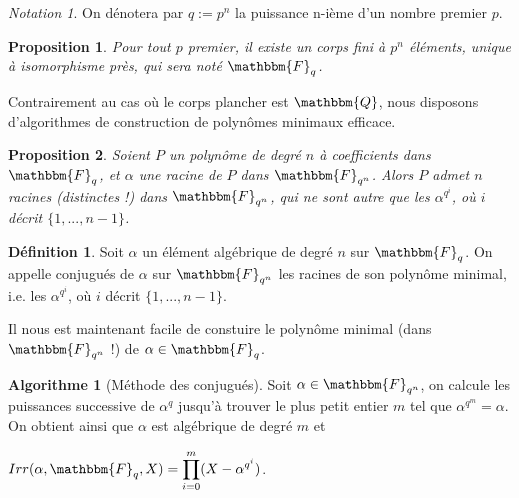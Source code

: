 \documentclass[12pt]{article}
\newcommand{\Q}{\mathbbm{Q}}
\newcommand{\Fq}{\mathbbm{F}_q}
\newcommand{\Fqn}{\mathbbm{F}_{q^n}}
\newtheorem{prop}{Proposition}
\theoremstyle{definition}\newtheorem{defn}{Définition}
\theoremstyle{definition}\newtheorem{exm}{Exemple}
\theoremstyle{definition}\newtheorem{rem}{Remarque}
\theoremstyle{definition}\newtheorem{algo}{Algorithme}
\theoremstyle{remark}\newtheorem{exo}{Exercice}
\theoremstyle{remark}\newtheorem{nota}{Notation}
\begin{document}
\begin{nota}
On dénotera par $q := p^n$ la puissance n-ième d'un nombre premier $p$.
\end{nota}

\begin{prop}
Pour tout $p$ premier, il existe un corps fini à $p^n$ éléments, unique à isomorphisme près, qui sera noté $\Fq$.
\end{prop}

Contrairement au cas où le corps plancher est $\Q$, nous disposons d'algorithmes de construction de polynômes minimaux efficace. 

\begin{prop}
Soient $P$ un polynôme de degré $n$ à coefficients dans $\Fq$, et $\alpha$ une racine de $P$ dans $\Fqn$. Alors $P$ admet $n$ racines (distinctes !) dans $\Fqn$, qui ne sont autre que les $\alpha^{q^i}$, où $i$ décrit $\{1, ..., n-1\}$.
\end{prop}

\begin{defn}
Soit $\alpha$ un élément algébrique de degré $n$ sur $\Fq$. On appelle conjugués de $\alpha$ sur $\Fqn$ les racines de son polynôme minimal, i.e. les $\alpha^{q^i}$, où $i$ décrit $\{1, ..., n-1\}$.
\end{defn}

Il nous est maintenant facile de constuire le polynôme minimal (dans $\Fqn$ !) de $\alpha \in \Fq$.

\begin{algo}[Méthode des conjugués]
Soit $\alpha \in \Fqn$, on calcule les puissances successive de $\alpha^{q}$ jusqu'à trouver le plus petit entier $m$ tel que $\alpha^{q^m} = \alpha$. On obtient ainsi que $\alpha$ est algébrique de degré $m$ et 
\begin{center} $Irr(\alpha, \Fq, X) = \displaystyle \prod_{i=0}^m (X-\alpha^{q^i})$. \end{center}
\end{algo}






\pagebreak


\end{document}
